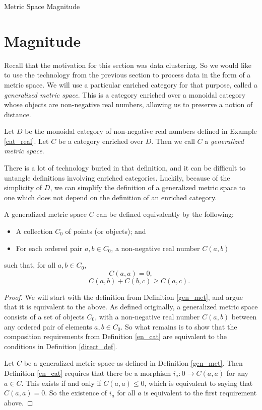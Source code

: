 \documentclass[12pt]{pom_thesis}
\begin{document}
\begin{chapter}{Metric Space Magnitude}
\section{Magnitude}
Recall that the motivation for this section was data clustering. So we would like to use the technology from the previous section to process data in the form of a metric space. We will use a particular enriched category for that purpose, called a \emph{generalized metric space}. This is a category enriched over a monoidal category whose objects are non-negative real numbers, allowing us to preserve a notion of distance. 
\begin{defn}\label{gen_met}
Let $D$ be the monoidal category of non-negative real numbers defined in Example \ref{cat_real}. Let $C$ be a category enriched over $D$. Then we call $C$ a \emph{generalized metric space}.
\end{defn}
There is a lot of technology buried in that definition, and it can be difficult to untangle definitions involving enriched categories. Luckily, because of the simplicity of $D$, we can simplify the definition of a generalized metric space to one which does not depend on the definition of an enriched category.
\begin{thm}\label{direct_def}
A generalized metric space $C$ can be defined equivalently by the following:
\begin{itemize}
\item A collection $C_0$ of points (or objects); and
\item For each ordered pair $a,b \in C_0$, a non-negative real number $C(a,b)$
\end{itemize}
such that, for all $a,b \in C_0$,
\[C(a,a) = 0,
\]
\[\hspace{1cm} C(a,b) + C(b,c) \geq C(a,c).
\]
\end{thm}
\begin{proof}
We will start with the definition from Definition \ref{gen_met}, and argue that it is equivalent to the above. As defined originally, a generalized metric space consists of a set of objects $C_0$, with a non-negative real number $C(a,b)$ between any ordered pair of elements $a,b \in C_0$. So what remains is to show that the composition requirements from Definition \ref{en_cat} are equivalent to the conditions in Definition  \ref{direct_def}. 

Let $C$ be a generalized metric space as defined in Definition \ref{gen_met}. Then Definition \ref{en_cat} requires that there be a morphism $i_a:0 \rightarrow C(a,a)$ for any $a \in C$. This exists if and only if $C(a,a) \leq 0$, which is equivalent to saying that $C(a,a)=0$. So the existence of $i_a$ for all $a$ is equivalent to the first requirement above.


\end{proof}
\end{chapter}
\end{document}
